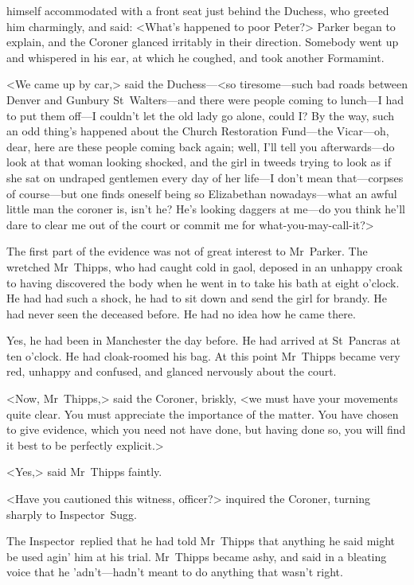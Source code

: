 himself accommodated with a front seat just behind the Duchess, who greeted him charmingly, and said: <What's happened to poor Peter?> Parker began to explain, and the Coroner glanced irritably in their direction. Somebody went up and whispered in his ear, at which he coughed, and took another Formamint.

<We came up by car,> said the Duchess—<so tiresome—such bad roads between Denver and Gunbury St~Walters—and there were people coming to lunch—I had to put them off—I couldn't let the old lady go alone, could I\@? By the way, such an odd thing's happened about the Church Restoration Fund—the Vicar—oh, dear, here are these people coming back again; well, I'll tell you afterwards—do look at that woman looking shocked, and the girl in tweeds trying to look as if she sat on undraped gentlemen every day of her life—I don't mean that—corpses of course—but one finds oneself being so Elizabethan nowadays—what an awful little man the coroner is, isn't he? He's looking daggers at me—do you think he'll dare to clear me out of the court or commit me for what-you-may-call-it?>

The first part of the evidence was not of great interest to Mr~Parker. The wretched Mr~Thipps, who had caught cold in gaol, deposed in an unhappy croak to having discovered the body when he went in to take his bath at eight o'clock. He had had such a shock, he had to sit down and send the girl for brandy. He had never seen the deceased before. He had no idea how he came there.

Yes, he had been in Manchester the day before. He had arrived at St~Pancras at ten o'clock. He had cloak-roomed his bag. At this point Mr~Thipps became very red, unhappy and confused, and glanced nervously about the court.

<Now, Mr~Thipps,> said the Coroner, briskly, <we must have your movements quite clear. You must appreciate the importance of the matter. You have chosen to give evidence, which you need not have done, but having done so, you will find it best to be perfectly explicit.>

<Yes,> said Mr~Thipps faintly.

<Have you cautioned this witness, officer?> inquired the Coroner, turning sharply to Inspector~Sugg.

The Inspector~replied that he had told Mr~Thipps that anything he said might be used agin' him at his trial. Mr~Thipps became ashy, and said in a bleating voice that he 'adn't—hadn't meant to do anything that wasn't right.

